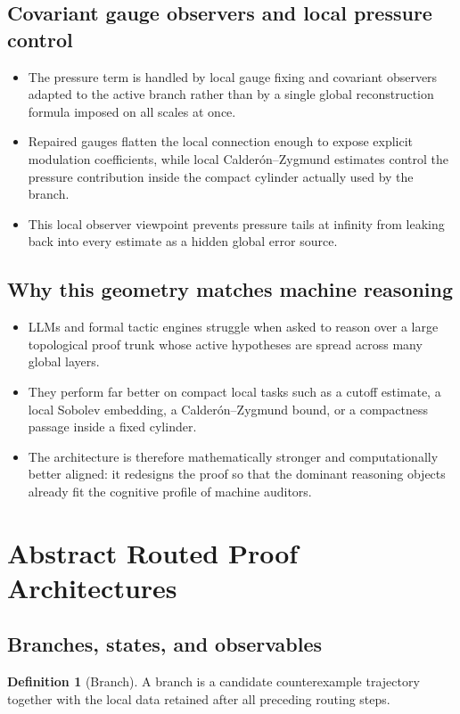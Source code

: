 \documentclass[11pt]{article}
\theoremstyle{plain}
\theoremstyle{definition}
\newtheorem{definition}[theorem]{Definition}
\theoremstyle{remark}
\begin{document}
\subsection{Covariant gauge observers and local pressure control}
\begin{itemize}
  \item The pressure term is handled by local gauge fixing and covariant observers adapted to the active branch rather than by a single global reconstruction formula imposed on all scales at once.
  \item Repaired gauges flatten the local connection enough to expose explicit modulation coefficients, while local Calder\'on--Zygmund estimates control the pressure contribution inside the compact cylinder actually used by the branch.
  \item This local observer viewpoint prevents pressure tails at infinity from leaking back into every estimate as a hidden global error source.
\end{itemize}

\subsection{Why this geometry matches machine reasoning}
\begin{itemize}
  \item LLMs and formal tactic engines struggle when asked to reason over a large topological proof trunk whose active hypotheses are spread across many global layers.
  \item They perform far better on compact local tasks such as a cutoff estimate, a local Sobolev embedding, a Calder\'on--Zygmund bound, or a compactness passage inside a fixed cylinder.
  \item The architecture is therefore mathematically stronger and computationally better aligned: it redesigns the proof so that the dominant reasoning objects already fit the cognitive profile of machine auditors.
\end{itemize}

\section{Abstract Routed Proof Architectures}
\label{sec:abstract-architecture}

\subsection{Branches, states, and observables}
\begin{definition}[Branch]
A branch is a candidate counterexample trajectory together with the local data retained after all preceding routing steps.
\end{definition}
\end{document}
